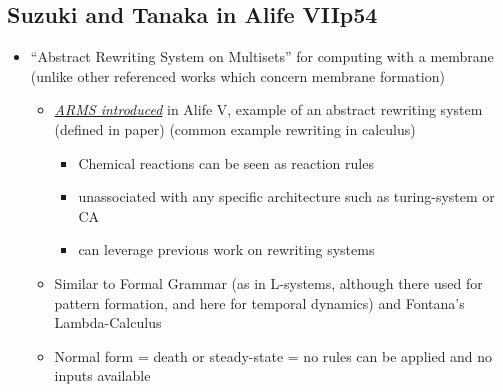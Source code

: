 		\hypertarget{suzuki-and-tanaka-in-alife-viip54}{\subsection{Suzuki and
				Tanaka in Alife VIIp54}\label{suzuki-and-tanaka-in-alife-viip54}}
		
		\begin{itemize}
			\item
			
			``Abstract Rewriting System on Multisets'' for computing with a
			membrane (unlike other referenced works which concern membrane
			formation)
			
			
			\begin{itemize}
				\item
				
				\href{https://books.google.co.nz/books?id=0J8kQEjXe38C\&pg=PA521\&lpg=PA521\&dq=suzuki+Abstract+Rewriting+System+on+Multisets\&source=bl\&ots=nmUxuxeEW2\&sig=5F8aDFQyFP17NMNNNBviRJjsL2E\&hl=en\&sa=X\&redir_esc=y\#v=onepage\&q=suzuki\%20Abstract\%20Rewriting\%20System\%20on\%20Multisets\&f=false}{\emph{ARMS
						introduced}} in Alife V, example of an abstract rewriting system
				(defined in paper) (common example rewriting in calculus)
				
				
				\begin{itemize}
					\item
					
					Chemical reactions can be seen as reaction rules
					
					\item
					
					unassociated with any specific architecture such as turing-system
					or CA
					
					\item
					
					can leverage previous work on rewriting systems
					
				\end{itemize}
				\item
				
				Similar to Formal Grammar (as in L-systems, although there used for
				pattern formation, and here for temporal dynamics) and Fontana's
				Lambda-Calculus
				
				\item
				
				Normal form = death or steady-state = no rules can be applied and no
				inputs available
				

\end{itemize}
\end{itemize}
